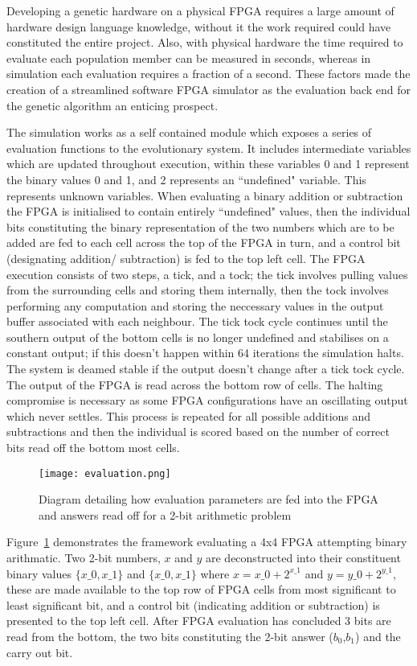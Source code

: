Developing a genetic hardware on a physical FPGA requires a large amount of hardware
design language knowledge, without it the work required could have constituted the
entire project. Also, with physical hardware the time required to evaluate each
population member can be measured in seconds, whereas in simulation each evaluation
requires a fraction of a second. These factors made the creation of a
streamlined software FPGA simulator as the evaluation back end for the
genetic algorithm an enticing prospect.

The simulation works as a self contained module which exposes a series of
evaluation functions to the evolutionary system.
It includes intermediate variables which are updated throughout
execution, within these variables 0 and 1 represent the binary values
0 and 1, and 2 represents an ``undefined" variable. This represents
unknown variables.
When evaluating a binary
addition or subtraction the FPGA is initialised to contain entirely ``undefined"
values, then the individual bits constituting the binary representation of the two numbers
which are to be added are fed
to each cell across the top of the FPGA in turn, and a control bit (designating addition/
subtraction) is fed to the top left cell. The FPGA execution consists of
two steps, a tick, and a tock; the tick involves pulling values from the surrounding
cells and storing them internally, then the tock involves performing any computation
and storing the neccessary values in the output buffer associated with each neighbour.
The tick tock
cycle continues until the southern output of the bottom cells is no longer undefined
and stabilises on a constant output; if this doesn't happen within 64 iterations
the simulation halts. The system is deamed stable if the output doesn't change after
a tick tock cycle.
The output of the FPGA is read across the bottom row of cells.
The halting compromise is necessary as some FPGA configurations
have an oscillating output which never settles. This process is repeated for all possible
additions and subtractions and then the individual is scored based on the number
of correct bits read off the bottom most cells.

\begin{figure}
\centering
\texttt{[image: evaluation.png]}
\caption{Diagram detailing how evaluation parameters are fed into the FPGA and answers
read off for a 2-bit arithmetic problem}
\label{fig:control}
\end{figure}

Figure~\ref{fig:control} demonstrates the framework evaluating a 4x4 FPGA attempting
binary arithmatic. Two 2-bit numbers, $x$ and $y$ are deconstructed into their constituent
binary values $\{x\_0,x\_1\}$ and $\{x\_0,x\_1\}$ where $x = x\_0 + 2^{x\_1}$ and $y = y\_0 + 2^{y\_1}$,
these are made available
to the top row of FPGA cells from most significant to least significant bit, and a
control bit (indicating addition or subtraction) is presented to the top left cell.
After FPGA evaluation has concluded 3 bits are read from the bottom, the two bits
constituting the 2-bit answer ($b_0$,$b_1$) and the carry out bit.

